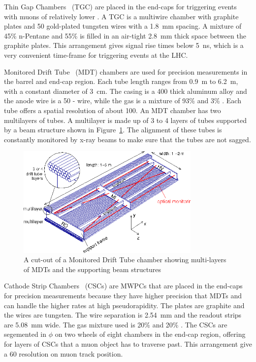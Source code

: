 \par Thin Gap Chambers~\cite{NAGAI1996219} (TGC) are placed in the end-caps for triggering events with muons of 
relatively lower \pT. A TGC is a multiwire chamber with graphite plates and \SI{50}{\micron} gold-plated 
tungsten wires with a \SI{1.8}{\mm} spacing. A mixture of 45\% n-Pentane and 55\%  is filled in an air-tight 
\SI{2.8}{\mm} thick space between the graphite plates. This arrangement gives signal rise times below \SI{5}{\nano\s}, which 
is a very convenient time-frame for triggering events at the LHC.  

\par Monitored Drift Tube~\cite{DIEHL2012543} (MDT) chambers are used for 
precision measurements in the barrel and end-cap region. Each tube 
length ranges from \SI{0.9}{\m} to \SI{6.2}{\m}, with a constant diameter of \SI{3}{\cm}. 
The casing is a \SI{400}{\micron} thick aluminum 
alloy and the anode wire is a \SI{50}{\micron} - wire, while the gas is a mixture of 93\%  and 3\% . 
Each tube offers a spatial resolution of about \SI{100}{\micron}. An MDT chamber has two multilayers of tubes. A 
multilayer is made up of 3 to 4 layers of tubes supported by a beam structure 
shown in Figure~\ref{fig:mdt}. The alignment of these tubes is constantly monitored 
by x-ray beams to make sure that the tubes are not sagged. 

\begin{figure}[!h]
	\centering
   \includegraphics[width=0.8\textwidth]{figures/mdt_chamber.png}
	\caption{A cut-out of a Monitored Drift Tube chamber showing multi-layers of MDTs and the supporting beam structures}
	\label{fig:mdt}
\end{figure}

\par Cathode Strip Chambers~\cite{Argyropoulos:2009zz} (CSCs) are MWPCs that are placed in the end-caps for precision 
measurements because they have higher precision that MDTs and can handle the higher rates at high 
pseudorapidity. The plates are graphite and the wires are tungsten. The wire separation is \SI{2.54}{\mm} 
and the readout strips are \SI{5.08}{\mm} wide. The gas mixture used is 20\%  and 20\% .
 The CSCs are segemented in 
$\phi$ on two wheels of eight chambers in the end-cap region, offering for layers of CSCs that a muon  
object has to traverse past. This arrangement give a \SI{60}{\micron} resolution on muon track position. 

